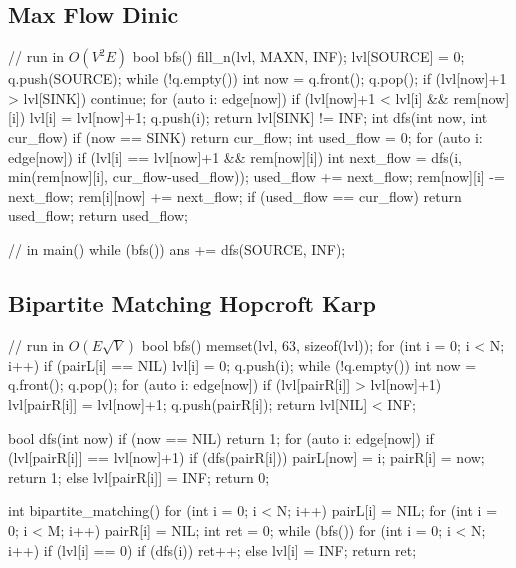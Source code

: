\documentclass[a4paper, landscape]{article}
\begin{document}
\begin{multicols*}{2}
	\subsection{Max Flow Dinic}
	\begin{cppcode}
		// run in $O(V^2E)$
		bool bfs() {
				fill_n(lvl, MAXN, INF);
				lvl[SOURCE] = 0;
				q.push(SOURCE);
				while (!q.empty()) {
						int now = q.front();
						q.pop();
						if (lvl[now]+1 > lvl[SINK]) continue;
						for (auto i: edge[now]) {
								if (lvl[now]+1 < lvl[i] && rem[now][i]) {
										lvl[i] = lvl[now]+1;
										q.push(i);
									}}}
				return lvl[SINK] != INF;
			}
		int dfs(int now, int cur_flow) {
				if (now == SINK) return cur_flow;
				int used_flow = 0;
				for (auto i: edge[now]) {
						if (lvl[i] == lvl[now]+1 && rem[now][i]) {
								int next_flow = dfs(i, min(rem[now][i], cur_flow-used_flow));
								used_flow += next_flow;
								rem[now][i] -= next_flow;
								rem[i][now] += next_flow;
								if (used_flow == cur_flow) return used_flow;
							}}
				return used_flow;
			}

		// in main()
		while (bfs()) {
				ans += dfs(SOURCE, INF);
			}
	\end{cppcode}

	\subsection{Bipartite Matching Hopcroft Karp}
	\begin{cppcode}
		// run in $O(E\sqrt{V})$
		bool bfs() {
				memset(lvl, 63, sizeof(lvl));
				for (int i = 0; i < N; i++) {
						if (pairL[i] == NIL) {
								lvl[i] = 0;
								q.push(i); }}
				while (!q.empty()) {
						int now = q.front(); q.pop();
						for (auto i: edge[now]) {
								if (lvl[pairR[i]] > lvl[now]+1) {
										lvl[pairR[i]] = lvl[now]+1;
										q.push(pairR[i]);
									}}}
				return lvl[NIL] < INF;
			}

		bool dfs(int now) {
				if (now == NIL) return 1;
				for (auto i: edge[now]) {
						if (lvl[pairR[i]] == lvl[now]+1) {
								if (dfs(pairR[i])) {
										pairL[now] = i;
										pairR[i] = now;
										return 1;
									} else lvl[pairR[i]] = INF;
							}}
				return 0;
			}

		int bipartite_matching() {
				for (int i = 0; i < N; i++) pairL[i] = NIL;
				for (int i = 0; i < M; i++) pairR[i] = NIL;
				int ret = 0;
				while (bfs()) {
						for (int i = 0; i < N; i++) {
								if (lvl[i] == 0) {
										if (dfs(i)) ret++;
										else lvl[i] = INF;
									}}}
				return ret;
			}
	\end{cppcode}


\end{multicols*}
\end{document}
